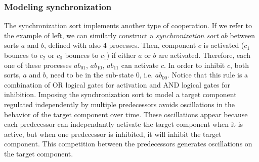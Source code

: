 \subsubsection{Modeling synchronization}
\label{sssec:synchronization}
The synchronization sort implements another type of cooperation. If we refer to the example of
 left, we can similarly construct a \emph{synchronization sort} $ab$ between sorts $a$ and $b$, defined with also 
4 processes. Then, component $c$ is activated ($c_1$ bounces to $c_2$ or $c_0$ bounces to $c_1$) if either  $a$ or $b$ are activated. Therefore, each one of 
these processes $ab_{01}$, $ab_{10}$, $ab_{11}$ can activate $c$.  In order to inhibit $c$, both sorts, $a$ and $b$, need to be 
in the sub-state $0$, i.e. $ab_{00}$. Notice that this rule is a combination of OR logical gates for activation and AND logical gates for inhibition.
Imposing the synchronization sort to model a target component regulated independently by multiple predecessors avoids oscillations in the behavior of the target component over time. 
These oscillations appear because each predecessor can independantly activate the target component when it is active,
but when one predecessor is inhibited, it will inhibit the target component. This competition between the predecessors
generates oscillations on the target component.  



